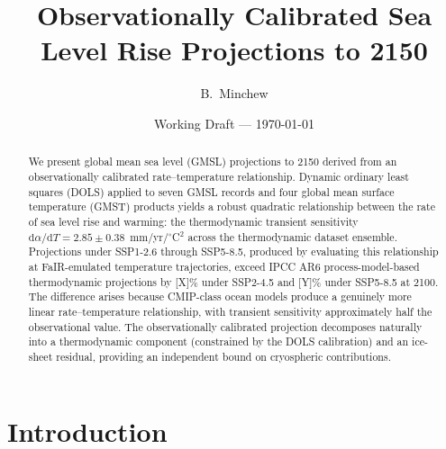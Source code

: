\documentclass[11pt]{article}
\title{Observationally Calibrated Sea Level Rise Projections to 2150}
\author{B.\ Minchew}
\date{Working Draft --- \today}
\newcommand{\daT}{\mathrm{d}\alpha/\mathrm{d}T}
\begin{document}
\maketitle


\begin{abstract}
We present global mean sea level (GMSL) projections to 2150 derived from an observationally calibrated rate--temperature relationship.
Dynamic ordinary least squares (DOLS) applied to seven GMSL records and four global mean surface temperature (GMST) products yields a robust quadratic relationship between the rate of sea level rise and warming: the thermodynamic transient sensitivity $\daT = 2.85 \pm 0.38$~mm/yr/${}^\circ$C$^2$ across the thermodynamic dataset ensemble.
Projections under SSP1-2.6 through SSP5-8.5, produced by evaluating this relationship at FaIR-emulated temperature trajectories, exceed IPCC AR6 process-model-based thermodynamic projections by [X]\% under SSP2-4.5 and [Y]\% under SSP5-8.5 at 2100.
The difference arises because CMIP-class ocean models produce a genuinely more linear rate--temperature relationship, with transient sensitivity approximately half the observational value.
The observationally calibrated projection decomposes naturally into a thermodynamic component (constrained by the DOLS calibration) and an ice-sheet residual, providing an independent bound on cryospheric contributions.
\end{abstract}


\section{Introduction}
\end{document}
